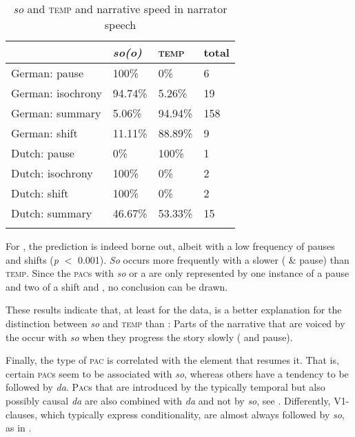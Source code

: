 \documentclass[output=paper,colorlinks,citecolor=brown]{langscibook}
\begin{document}
\begin{table}[ht]
\caption{\textit{so} and \textsc{temp} and narrative speed in narrator speech} \label{tab-RE:SPEEDY}
\begin{tabularx}{0.8\textwidth}{lYYY}
\lsptoprule
& {\textit{{so(o)}}}& {\textsc{{temp}}}& {{total}}	\\
\midrule
German: pause	& 100\% & 0\% & 	6\\
	German: isochrony & 94.74\% & 5.26\% &19 \\
	German: summary & 5.06\% & 94.94\% & 158 \\
	German: shift & 11.11\% & 88.89\% & 9\\
	\midrule
	Dutch: pause 	&0\% & 100\% & 1	\\
	Dutch: isochrony & 100\% & 0\% & 2\\
	Dutch: shift & 100\% & 0\% & 2\\
	Dutch: summary & 46.67\% & 53.33\% & 15 \\
	\lspbottomrule
	\end{tabularx}
\end{table}

\noindent 
For , the prediction is indeed borne out, albeit with a low frequency of pauses and shifts (\textit{p} $<$ 0.001). \textit{So} occurs more frequently with a slower  ( \& pause) than \textsc{temp}. Since the  \textsc{pac}s with \textit{so} or a  are only represented by one instance of a pause and two of a shift and , no conclusion can be drawn. 

These results indicate that, at least for the  data,  is a better explanation for the distinction between \textit{so} and \textsc{temp} than : Parts of the narrative that are voiced by the  occur with \textit{so} when they progress the story slowly ( and pause).

Finally, the type of \textsc{pac} is correlated with the element that resumes it. That is, certain \textsc{pac}s seem to be associated with \textit{so}, whereas others have a tendency to be followed by \textit{da}. \textsc{Pac}s that are introduced by the typically temporal but also possibly causal  \textit{da} are also combined with \textit{da} and not by \textit{so}, see . 
Differently, V1-clauses, which typically express conditionality, are almost always followed by \textit{so}, as in .
\end{document}
